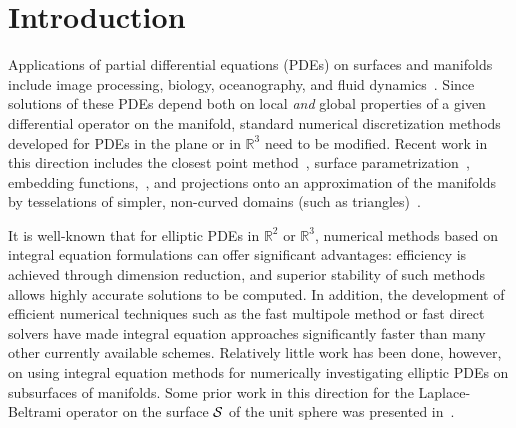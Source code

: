 \section{Introduction}

Applications of partial differential equations (PDEs) on surfaces and
manifolds include image processing, biology, oceanography, and fluid
dynamics~\cite{Chaplain,Myers,Witkin}.  Since solutions of these PDEs
depend both on local {\it and} global properties of a given
differential operator on the manifold, standard numerical
discretization methods developed for PDEs in the plane or in
$\mathbb{R}^3$ need to be modified. Recent work in this direction
includes the closest point method~\cite{ruuth}, surface
parametrization~\cite{floater}, embedding functions,~\cite{Bertalmio},
and projections onto an approximation of the manifolds by tesselations
of simpler, non-curved domains (such as triangles)~\cite{lindblom}. 

It is well-known that for elliptic PDEs in $\mathbb{R}^2$ or
$\mathbb{R}^3$, numerical methods based on integral equation
formulations can offer significant advantages: efficiency is achieved
through dimension reduction, and superior stability of such methods
allows highly accurate solutions to be computed.  In addition, the
development of efficient numerical techniques such as the fast
multipole method or fast direct solvers have made integral equation
approaches significantly faster than many other currently available
schemes.  Relatively little work has been done, however, on using
integral equation methods for numerically investigating elliptic PDEs
on subsurfaces of manifolds.  Some prior work in this direction for the
Laplace-Beltrami operator on the surface $\cal{S}$ of the unit sphere
was presented in~\cite{gemmrich,kro:nig2013}.

